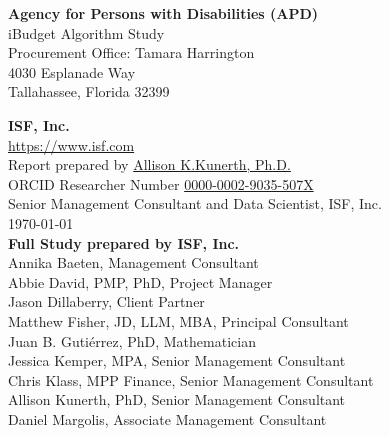 \documentclass[12pt, letterpaper]{article}
\begin{document}
\begin{flushleft}

\phantom{ghost text}

\vspace{\fill}

\noindent \textbf{Agency for Persons with Disabilities (APD)} \\
iBudget Algorithm Study\\
Procurement Office: Tamara Harrington \\
4030 Esplanade Way \\
Tallahassee, Florida 32399

\vspace{1cm}
\noindent \textbf{ISF, Inc.} \\
\url{https://www.isf.com}\\
Report prepared by \href{mailto:akunerth@isf.com} {Allison K.Kunerth, Ph.D.}\\
ORCID Researcher Number \href{https://orcid.org/0000-0002-9035-507X}{0000-0002-9035-507X}\\
Senior Management Consultant and Data Scientist, ISF, Inc.\\
\today\\

\vspace{\fill}
\noindent \textbf{Full Study prepared by ISF, Inc.} \\
 Annika Baeten, Management Consultant \\
Abbie David, PMP, PhD, Project Manager\\
 Jason Dillaberry, Client Partner \\
 Matthew Fisher, JD, LLM, MBA, Principal Consultant \\
 Juan B. Gutiérrez, PhD, Mathematician \\
 Jessica Kemper, MPA, Senior Management Consultant \\
 Chris Klass, MPP Finance, Senior Management Consultant \\
Allison Kunerth, PhD, Senior Management Consultant \\
 Daniel Margolis, Associate Management Consultant \\
\end{flushleft}




\end{document}
